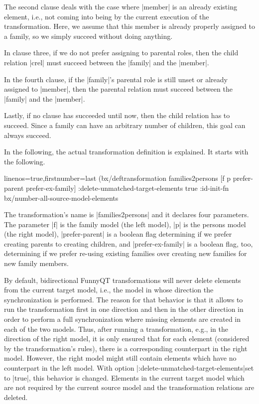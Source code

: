\documentclass[a4paper]{article}
\newcommand{\code}{\clojureinline}
\begin{document}
The second clause deals with the case where \code|member| is an already
existing element, i.e., not coming into being by the current execution of the
transformation.  Here, we assume that this member is already properly assigned
to a family, so we simply succeed without doing anything.

In clause three, if we do not prefer assigning to parental roles, then the
child relation \code|crel| must succeed between the \code|family| and the
\code|member|.

In the fourth clause, if the \code|family|'s parental role is still unset or
already assigned to \code|member|, then the parental relation must succeed
between the \code|family| and the \code|member|.

Lastly, if no clause has succeeded until now, then the child relation has to
succeed.  Since a family can have an arbitrary number of children, this goal
can always succeed.

\bigskip{}

In the following, the actual transformation definition is explained.  It starts
with the following.

\begin{clojurecode*}{linenos=true,firstnumber=last}
(bx/deftransformation families2persons [f p prefer-parent prefer-ex-family]
  :delete-unmatched-target-elements true
  :id-init-fn bx/number-all-source-model-elements
\end{clojurecode*}

The transformation's name is \code|families2persons| and it declares four
parameters.  The parameter \code|f| is the family model (the left model),
\code|p| is the persons model (the right model), \code|prefer-parent| is a
boolean flag determining if we prefer creating parents to creating children,
and \code|prefer-ex-family| is a boolean flag, too, determining if we prefer
re-using existing families over creating new families for new family members.

By default, bidirectional FunnyQT transformations will never delete elements
from the current target model, i.e., the model in whose direction the
synchronization is performed.  The reason for that behavior is that it allows
to run the transformation first in one direction and then in the other
direction in order to perform a full synchronization where missing elements are
created in each of the two models.  Thus, after running a transformation, e.g.,
in the direction of the right model, it is only ensured that for each element
(considered by the transformation's rules), there is a corresponding
counterpart in the right model.  However, the right model might still contain
elements which have no counterpart in the left model.  With option
\code|:delete-unmatched-target-elements|set to \code|true|, this behavior is
changed.  Elements in the current target model which are not required by the
current source model and the transformation relations are deleted.
\end{document}
